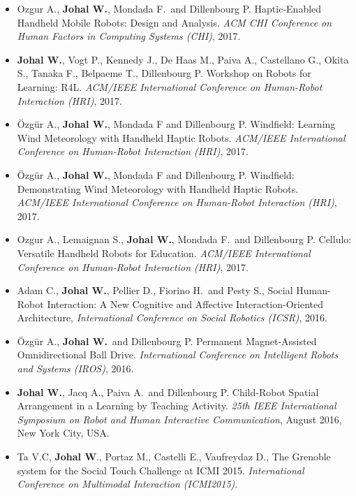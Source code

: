 \begin{itemize}[nosep]
    \item Ozgur A., \textbf{Johal W.}, Mondada F.\ and Dillenbourg P. Haptic-Enabled Handheld Mobile Robots: Design and Analysis. \textit{ACM CHI Conference on Human Factors in Computing Systems (CHI)}, 2017.

    \item \textbf{Johal W.}, Vogt P., Kennedy J., De Haas M., Paiva A., Castellano G., Okita S., Tanaka F., Belpaeme T., Dillenbourg P. Workshop on Robots for Learning: R4L. \textit{ACM/IEEE International Conference on Human-Robot Interaction (HRI)}, 2017.

    \item Özgür A., \textbf{Johal W.}, Mondada F and Dillenbourg P. Windfield: Learning Wind Meteorology with Handheld Haptic Robots. \textit{ACM/IEEE International Conference on Human-Robot Interaction (HRI)}, 2017.

    \item Özgür A., \textbf{Johal W.}, Mondada F and Dillenbourg P. Windfield: Demonstrating Wind Meteorology with Handheld Haptic Robots. \textit{ACM/IEEE International Conference on Human-Robot Interaction (HRI)}, 2017.

    \item Ozgur A., Lemaignan S., \textbf{Johal W.}, Mondada F.\ and Dillenbourg P. Cellulo: Versatile Handheld Robots for Education. \textit{ACM/IEEE International Conference on Human-Robot Interaction (HRI)}, 2017. \faTrophy

    \item Adam C., \textbf{Johal W.}, Pellier D., Fiorino H.\ and Pesty S., Social Human-Robot Interaction: A New Cognitive and Affective Interaction-Oriented Architecture, \textit{International Conference on Social Robotics (ICSR)}, 2016.

    \item Özgür A., \textbf{Johal W.}\ and Dillenbourg P. Permanent Magnet-Assisted Omnidirectional Ball Drive. \textit{International Conference on Intelligent Robots and Systems (IROS)}, 2016.

    \item \textbf{Johal W.}, Jacq A., Paiva A.\ and Dillenbourg P. Child-Robot Spatial Arrangement in a Learning by Teaching Activity. \textit{25th IEEE International Symposium on Robot and Human Interactive Communication}, August 2016, New York City, USA.

    \item Ta V.C, \textbf{Johal W}., Portaz M., Castelli E., Vaufreydaz D., The Grenoble system for the Social Touch Challenge at ICMI 2015. \textit{International Conference on Multimodal Interaction (ICMI2015)}. \faTrophy


\end{itemize}
